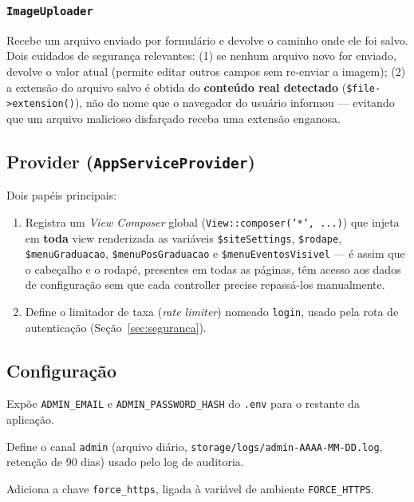 \documentclass[11pt,a4paper]{article}
\begin{document}
\subsubsection{\texttt{ImageUploader}}
Recebe um arquivo enviado por formulário e devolve o caminho onde ele foi salvo. Dois cuidados
de segurança relevantes: (1) se nenhum arquivo novo for enviado, devolve o valor atual (permite
editar outros campos sem re-enviar a imagem); (2) a extensão do arquivo salvo é obtida do
\textbf{conteúdo real detectado} (\texttt{\$file->extension()}), não do nome que o navegador do
usuário informou — evitando que um arquivo malicioso disfarçado receba uma extensão enganosa.

\subsection{Provider (\texttt{AppServiceProvider})}

Dois papéis principais:

\begin{enumerate}[leftmargin=2em]
    \item Registra um \emph{View Composer} global (\texttt{View::composer('*', ...)}) que
          injeta em \textbf{toda} view renderizada as variáveis \texttt{\$siteSettings},
          \texttt{\$rodape}, \texttt{\$menuGraduacao}, \texttt{\$menuPosGraduacao} e
          \texttt{\$menuEventosVisivel} — é assim que o cabeçalho e o rodapé, presentes em
          todas as páginas, têm acesso aos dados de configuração sem que cada controller
          precise repassá-los manualmente.
    \item Define o limitador de taxa (\emph{rate limiter}) nomeado \texttt{login}, usado pela
          rota de autenticação (Seção~\ref{sec:seguranca}).
\end{enumerate}

\subsection{Configuração}

\begin{description}[leftmargin=2em,style=nextline]
    \item[\texttt{config/admin.php}] Expõe \texttt{ADMIN\_EMAIL} e \texttt{ADMIN\_PASSWORD\_HASH}
        do \texttt{.env} para o restante da aplicação.
    \item[\texttt{config/logging.php}] Define o canal \texttt{admin} (arquivo diário,
        \texttt{storage/logs/admin-AAAA-MM-DD.log}, retenção de 90 dias) usado pelo log de
        auditoria.
    \item[\texttt{config/app.php}] Adiciona a chave \texttt{force\_https}, ligada à variável de
        ambiente \texttt{FORCE\_HTTPS}.
\end{description}
\end{document}
